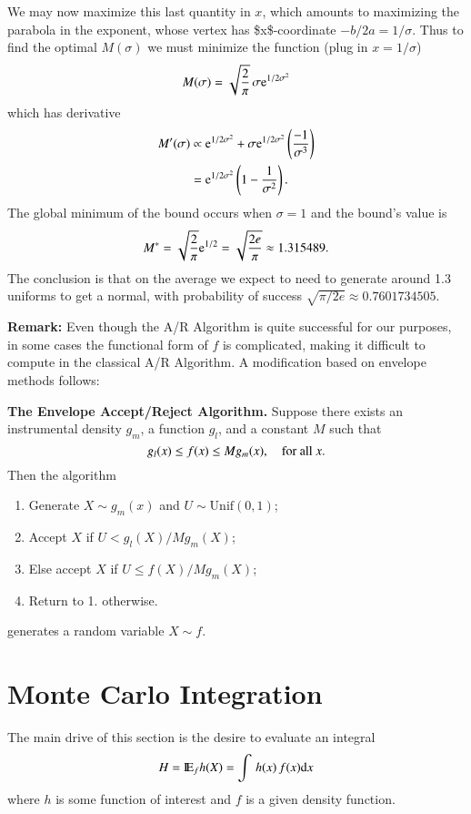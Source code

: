 \documentclass[11pt,english]{scrbook}
\begin{document}
We may now maximize this last quantity in \(x\), which amounts to maximizing the parabola in the exponent, whose vertex has \$x\$-coordinate \(-b/2a = 1/\sigma\). Thus to find the optimal \(M(\sigma)\) we must minimize the function (plug in \(x=1/\sigma\)) 
\[
M(\sigma)=\sqrt{\frac{2}{\pi}}\,\sigma \mathrm{e}^{1/2\sigma^{2}}
\]
which has derivative 
\begin{align*}
M'(\sigma) & \propto \mathrm{e}^{1/2\sigma^{2}}+\sigma \mathrm{e}^{1/2\sigma^{2}}\left(\frac{-1}{\sigma^{3}}\right)\\
 & = \mathrm{e}^{1/2\sigma^{2}}\left(1-\frac{1}{\sigma^{2}}\right).
\end{align*}
The global minimum of the bound occurs when \(\sigma=1\) and the bound's value is 
\[
M^{\ast}=\sqrt{\frac{2}{\pi}}\mathrm{e}^{1/2}=\sqrt{\frac{2e}{\pi}}\approx 1.315489.
\]
The conclusion is that on the average we expect to need to generate around 1.3 uniforms to get a normal, with probability of success \(\sqrt{\pi/2e}\approx0.7601734505\).

\textbf{Remark:} Even though the A/R Algorithm is quite successful for our purposes, in some cases the functional form of \(f\) is complicated, making it difficult to compute in the classical A/R Algorithm. A modification based on envelope methods follows:

\textbf{The Envelope Accept/Reject Algorithm.} Suppose there exists an instrumental density \(g_{m}\), a function \(g_{l}\), and a constant \(M\) such that 
\[
g_{l}(x)\leq f(x)\leq Mg_{m}(x),\quad\mbox{for all \ensuremath{x}}.
\]
Then the algorithm
\begin{enumerate}
\item Generate \(X\sim g_{m}(x)\) and \(U\sim\mathrm{Unif}(0,1)\);
\item Accept \(X\) if \(U < g_{l}(X)/Mg_{m}(X)\);
\item Else accept \(X\) if \(U \leq f(X)/M g_{m}(X)\);
\item Return to 1. otherwise.
\end{enumerate}

generates a random variable \(X \sim f\).


\chapter{Monte Carlo Integration}
\label{sec:org8bca4f1}

The main drive of this section is the desire to evaluate an integral
\[
H=\mathrm{I\hspace{-1.5pt}E}_{f}h(X)=\int\, h(x)\, f(x)\mathrm{d} x
\]
 where \(h\) is some function of interest and \(f\) is a given density function.
\end{document}

